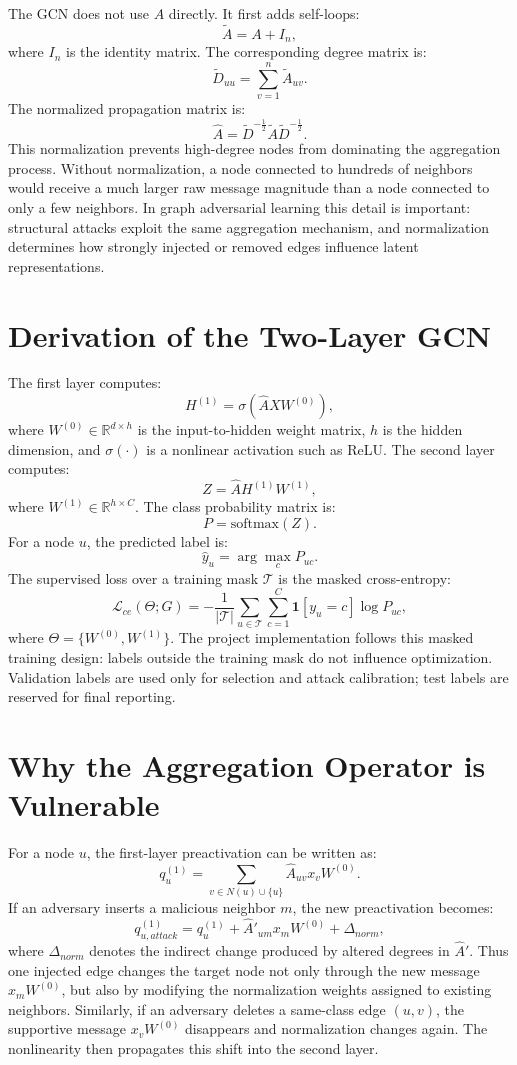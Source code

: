 \documentclass[12pt,oneside]{report}
\begin{document}
The GCN does not use $A$ directly. It first adds self-loops:
$$
\tilde{A}=A+I_n,
$$
where $I_n$ is the identity matrix. The corresponding degree matrix is:
$$
\tilde{D}_{uu}=\sum_{v=1}^{n}\tilde{A}_{uv}.
$$
The normalized propagation matrix is:
$$
\hat{A}=\tilde{D}^{-\frac{1}{2}}\tilde{A}\tilde{D}^{-\frac{1}{2}}.
$$
This normalization prevents high-degree nodes from dominating the aggregation process. Without normalization, a node connected to hundreds of neighbors would receive a much larger raw message magnitude than a node connected to only a few neighbors. In graph adversarial learning this detail is important: structural attacks exploit the same aggregation mechanism, and normalization determines how strongly injected or removed edges influence latent representations.

\section{Derivation of the Two-Layer GCN}
The first layer computes:
$$
H^{(1)}=\sigma(\hat{A}XW^{(0)}),
$$
where $W^{(0)}\in\mathbb{R}^{d\times h}$ is the input-to-hidden weight matrix, $h$ is the hidden dimension, and $\sigma(\cdot)$ is a nonlinear activation such as ReLU. The second layer computes:
$$
Z=\hat{A}H^{(1)}W^{(1)},
$$
where $W^{(1)}\in\mathbb{R}^{h\times C}$. The class probability matrix is:
$$
P=\text{softmax}(Z).
$$
For a node $u$, the predicted label is:
$$
\hat{y}_u=\arg\max_{c}P_{uc}.
$$
The supervised loss over a training mask $\mathcal{T}$ is the masked cross-entropy:
$$
\mathcal{L}_{ce}(\Theta;G)=
-\frac{1}{|\mathcal{T}|}\sum_{u\in\mathcal{T}}\sum_{c=1}^{C}
\mathbf{1}[y_u=c]\log P_{uc},
$$
where $\Theta=\{W^{(0)},W^{(1)}\}$. The project implementation follows this masked training design: labels outside the training mask do not influence optimization. Validation labels are used only for selection and attack calibration; test labels are reserved for final reporting.

\section{Why the Aggregation Operator is Vulnerable}
For a node $u$, the first-layer preactivation can be written as:
$$
q_u^{(1)}=\sum_{v\in N(u)\cup\{u\}}\hat{A}_{uv}x_vW^{(0)}.
$$
If an adversary inserts a malicious neighbor $m$, the new preactivation becomes:
$$
q_{u,attack}^{(1)}=q_u^{(1)}+\hat{A}'_{um}x_mW^{(0)}+\Delta_{norm},
$$
where $\Delta_{norm}$ denotes the indirect change produced by altered degrees in $\hat{A}'$. Thus one injected edge changes the target node not only through the new message $x_mW^{(0)}$, but also by modifying the normalization weights assigned to existing neighbors. Similarly, if an adversary deletes a same-class edge $(u,v)$, the supportive message $x_vW^{(0)}$ disappears and normalization changes again. The nonlinearity then propagates this shift into the second layer.
\end{document}
